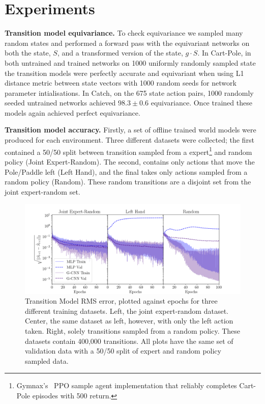 \documentclass[mlabstract]{jmlr}
\begin{document}
\vspace{-10}
\section{Experiments}

\indent \indent \textbf{Transition model equivariance.} To check equivariance we sampled many random states and performed a forward pass with the equivariant networks on both the state, $S$, and a transformed version of the state, $g \cdot S$. In Cart-Pole, in both untrained and trained networks on 1000 uniformly randomly sampled state the transition models were perfectly accurate and equivariant when using L1 distance metric between state vectors with 1000 random seeds for network parameter intialisations. In Catch, on the 675 state action pairs, 1000 randomly seeded untrained networks achieved $98.3 \pm 0.6$ equivariance. Once trained these models again achieved perfect equivariance.

\textbf{Transition model accuracy.} Firstly, a set of offline trained world models were produced for each environment. Three different datasets were collected; the first contained a 50/50 split between transition sampled from a expert\footnote{Gymnax's~\cite{lu2022discovered} PPO sample agent implementation that reliably completes Cart-Pole episodes with 500 return.} and random policy (Joint Expert-Random). The second, contains only actions that move the Pole/Paddle left (Left Hand), and the final takes only actions sampled from a random policy (Random). These random transitions are a disjoint set from the joint expert-random set.

\begin{figure}
	\centering
	\includegraphics[width=.65\textwidth]{Figures/transition_model_loss.png}
	\caption{Transition Model RMS error, plotted against epochs for three different training
		datasets. Left, the joint expert-random dataset. Center, the same dataset as
		left, however, with only the left action taken. Right, solely transitions sampled
		from a random policy. These datasets contain 400,000 transitions. All plots have
		the same set of validation data with a 50/50 split of expert and random policy
		sampled data.}\label{fig:tm_cp}
\end{figure}
\end{document}
